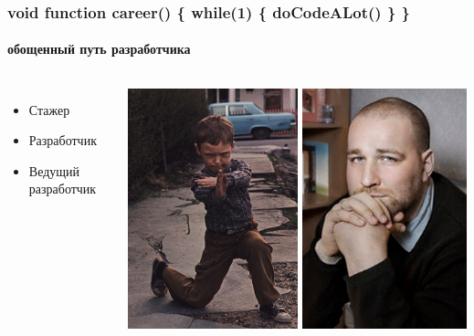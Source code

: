 \documentclass[10pt,pdf,hyperref={unicode}]{beamer}
\begin{document}
\begin{frame}
\frametitle{void function career() \{ while(1) \{ doCodeALot() \} \} }
\framesubtitle{ обощенный путь разработчика }

\begin{columns}[T]

		\begin{itemize}
			\item Стажер
			\item Разработчик
			\item Ведущий разработчик
		\end{itemize}


		\includegraphics[width=0.5\textwidth]{./intern.png}
		\includegraphics[width=0.484\textwidth]{./senior.png}

\end{columns}

\end{frame}
\end{document}
